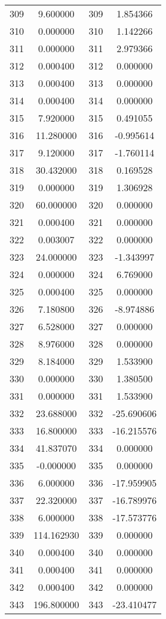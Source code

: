 \documentclass[12pt]{article}
\begin{document}
\begin{longtable}{@{}cccc@{}}
309 & 9.600000 & 309 & 1.854366 \\
310 & 0.000000 & 310 & 1.142266 \\
311 & 0.000000 & 311 & 2.979366 \\
312 & 0.000400 & 312 & 0.000000 \\
313 & 0.000400 & 313 & 0.000000 \\
314 & 0.000400 & 314 & 0.000000 \\
315 & 7.920000 & 315 & 0.491055 \\
316 & 11.280000 & 316 & -0.995614 \\
317 & 9.120000 & 317 & -1.760114 \\
318 & 30.432000 & 318 & 0.169528 \\
319 & 0.000000 & 319 & 1.306928 \\
320 & 60.000000 & 320 & 0.000000 \\
321 & 0.000400 & 321 & 0.000000 \\
322 & 0.003007 & 322 & 0.000000 \\
323 & 24.000000 & 323 & -1.343997 \\
324 & 0.000000 & 324 & 6.769000 \\
325 & 0.000400 & 325 & 0.000000 \\
326 & 7.180800 & 326 & -8.974886 \\
327 & 6.528000 & 327 & 0.000000 \\
328 & 8.976000 & 328 & 0.000000 \\
329 & 8.184000 & 329 & 1.533900 \\
330 & 0.000000 & 330 & 1.380500 \\
331 & 0.000000 & 331 & 1.533900 \\
332 & 23.688000 & 332 & -25.690606 \\
333 & 16.800000 & 333 & -16.215576 \\
334 & 41.837070 & 334 & 0.000000 \\
335 & -0.000000 & 335 & 0.000000 \\
336 & 6.000000 & 336 & -17.959905 \\
337 & 22.320000 & 337 & -16.789976 \\
338 & 6.000000 & 338 & -17.573776 \\
339 & 114.162930 & 339 & 0.000000 \\
340 & 0.000400 & 340 & 0.000000 \\
341 & 0.000400 & 341 & 0.000000 \\
342 & 0.000400 & 342 & 0.000000 \\
343 & 196.800000 & 343 & -23.410477 \\

\end{longtable}
\end{document}
